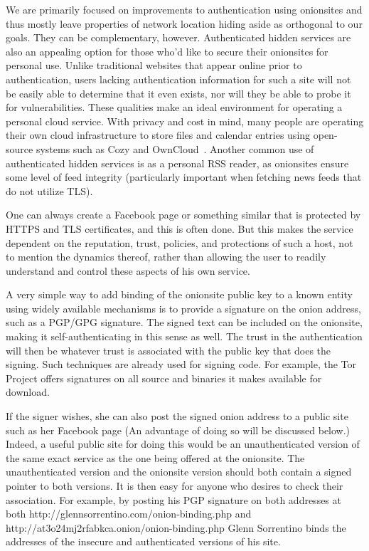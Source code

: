 \documentclass[10pt, conference, compsocconf]{styles/IEEEtran}
\begin{document}
We are primarily focused on improvements to authentication using
onionsites and thus mostly leave properties of network location hiding
aside as orthogonal to our goals. They can be complementary, however.
Authenticated
hidden services are also an appealing option for those who'd like to
secure their onionsites for personal use.  Unlike traditional websites
that appear online prior to authentication, users lacking
authentication information for such a site will not be easily able to
determine that it even exists, nor will they be able to probe it for
vulnerabilities.  These qualities make an ideal environment for
operating a personal cloud service.  With privacy and cost in mind,
many people are operating their own cloud infrastructure to store
files and calendar entries using open-source systems such as Cozy and
OwnCloud~\cite{cozy}.  Another common use of authenticated hidden
services is as a personal RSS reader, as onionsites ensure some level
of feed integrity (particularly important when fetching news feeds
that do not utilize TLS).

One can always create a Facebook page or something similar
that is protected by HTTPS and TLS certificates,
and this is often done.  But this makes the service dependent on the
reputation, trust, policies, and protections of such a host, not to mention
the dynamics thereof, rather than allowing the user to readily understand
and control these aspects of his own service. 

A very simple way to add binding of the onionsite public key to
a known entity using widely available mechanisms is to provide a
signature on the onion address, such as a PGP/GPG signature.
The signed text can be
included on the onionsite, making it self-authenticating in this sense
as well. The trust in the authentication will then be whatever trust
is associated with the public key that does the signing. Such
techniques are already used for signing code. For example,
the Tor Project offers signatures on all source and binaries
it makes available for download. 

If the signer wishes, she can also post the signed onion address to a
public site such as her Facebook page (An advantage of doing so will
be discussed below.) Indeed, a useful public site for
doing this would be an unauthenticated version of the same exact
service as the one being offered at the onionsite.  The
unauthenticated version and the onionsite version should both contain
a signed pointer to both versions. It is then easy for anyone who
desires to check their association.  For example, by posting his PGP
signature on both addresses at both
http://glennsorrentino.com/onion-binding.php and
http://at3o24mj2rfabkca.onion/onion-binding.php Glenn Sorrentino binds
the addresses of the insecure and authenticated versions of his site.
\end{document}
